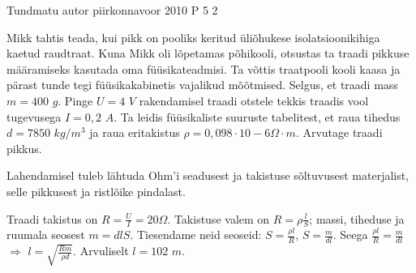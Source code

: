 {Tundmatu autor} %
{piirkonnavoor} %
{2010} %
{P 5} %
{2} %
{

\ifStatement
Mikk tahtis teada, kui pikk on pooliks keritud üliõhukese isolatsioonikihiga kaetud raudtraat. Kuna Mikk oli lõpetamas põhikooli, otsustas ta traadi pikkuse määramiseks kasutada oma füüsikateadmisi. Ta võttis traatpooli kooli kaasa ja pärast tunde tegi füüsikakabinetis vajalikud mõõtmised. Selgus, et traadi mass $m = 400$ $g$. Pinge $U = 4$ $V$ rakendamisel traadi otstele tekkis traadis vool tugevusega $I = 0,2$ $A$. Ta leidis füüsikaliste suuruste tabelitest, et raua tihedus $d = 7850$ $kg/m^3$ ja raua eritakistus $\rho = 0,098 \cdot 10 - 6 \Omega \cdot m$. Arvutage traadi pikkus.
\fi

\ifHint
Lahendamisel tuleb lähtuda Ohm'i seadusest ja takistuse sõltuvusest materjalist, selle pikkusest ja ristlõike pindalast.
\fi

\ifSolution
Traadi takistus on $R = \frac{U}{I} = 20 \Omega$. Takistuse valem on $R = \rho \frac{l}{S}$; massi, tiheduse ja ruumala seosest $m = d l S$. Tiesendame neid seoseid:
$S = \frac{\rho l}{R}$, $S = \frac{m}{dl}$.
Seega 
$\frac{\rho l}{R} = \frac{m}{dl}$ $\Rightarrow$ $l = \sqrt{\frac{Rm}{\rho d}}$.
Arvuliselt $l = 102$ $m$.
\fi
}